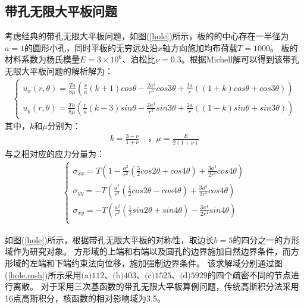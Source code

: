 \subsection{带孔无限大平板问题}
考虑经典的带孔无限大平板问题，如图(\ref{hole})所示，板的的中心存在一半径为$a=1$的圆形小孔，同时平板的无穷远处沿$x$轴方向施加均布荷载$T=1000$。
板的材料系数为杨氏模量$E=3\times10^6$、泊松比$\nu=0.3$。根据Michell解可以得到该带孔无限大平板问题的解析解为：
\begin{equation}
\begin{split}
\begin{cases}
    u_x(r,\theta)=\frac{Ta}{8\mu}(\frac{r}{a}(k+1)cos\theta-\frac{2a^3}{r^3}cos3\theta+\frac{2a}{r}((1+k)cos\theta+cos3\theta))\\
    u_y(r,\theta)=\frac{Ta}{8\mu}(\frac{r}{a}(k-3)sin\theta-\frac{2a^3}{r^3}sin3\theta+\frac{2a}{r}((1-k)sin\theta+sin3\theta))  
\end{cases}
\end{split}
\end{equation}
其中，$k$和$\mu$分别为：
\begin{equation}
\begin{split}
    k=\frac{3-\nu}{1+\nu}\quad \text{，}\mu=\frac{E}{2(1+\nu)}
\end{split}
\end{equation}
与之相对应的应力分量为：
\begin{equation}
\begin{split}
\begin{cases}
    \sigma_{xx}=T(1-\frac{a^2}{r^2}(\frac{3}{2}cos2\theta+cos4\theta)+\frac{3a^4}{2r^4}cos4\theta)\\
    \sigma_{yy}=-T(\frac{a^2}{r^2}(\frac{1}{2}cos2\theta-cos4\theta)+\frac{3a^4}{2r^4}cos4\theta)\\
    \sigma_{xy}=-T(\frac{a^2}{r^2}(\frac{1}{2}sin2\theta+sin4\theta)-\frac{3a^4}{2r^4}sin4\theta)\\
\end{cases}
\end{split}
\end{equation}\par
如图(\ref{hole})所示，根据带孔无限大平板的对称性，取边长$b=5$的四分之一的方形域作为研究对象。
方形域的上端和右端以及圆孔的边界施加自然边界条件，而方形域的左端和下端约束法向位移，施加强制边界条件。
该求解域分别通过图(\ref{hole.msh})所示采用$\text{(a)}112$、$\text{(b)}403$、$\text{(c)}1525$、$\text{(d)}5929$的四个疏密不同的节点进行离散。
对于采用三次基函数的带孔无限大平板算例问题，传统高斯积分法采用16点高斯积分，核函数的相对影响域为3.5。\par
